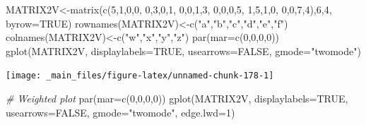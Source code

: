 \documentclass[
  notitlepage,
  onecolumn,
  openany]{book}
\newenvironment{Shaded}{\begin{snugshade}}{\end{snugshade}}
\newcommand{\AttributeTok}[1]{\textcolor[rgb]{0.77,0.63,0.00}{#1}}
\newcommand{\CommentTok}[1]{\textcolor[rgb]{0.56,0.35,0.01}{\textit{#1}}}
\newcommand{\ConstantTok}[1]{\textcolor[rgb]{0.00,0.00,0.00}{#1}}
\newcommand{\DecValTok}[1]{\textcolor[rgb]{0.00,0.00,0.81}{#1}}
\newcommand{\FunctionTok}[1]{\textcolor[rgb]{0.00,0.00,0.00}{#1}}
\newcommand{\NormalTok}[1]{#1}
\newcommand{\OtherTok}[1]{\textcolor[rgb]{0.56,0.35,0.01}{#1}}
\newcommand{\StringTok}[1]{\textcolor[rgb]{0.31,0.60,0.02}{#1}}
\begin{document}
\begin{Shaded}
\begin{Highlighting}[]
\NormalTok{MATRIX2V}\OtherTok{\textless{}{-}}\FunctionTok{matrix}\NormalTok{(}\FunctionTok{c}\NormalTok{(}\DecValTok{5}\NormalTok{,}\DecValTok{1}\NormalTok{,}\DecValTok{0}\NormalTok{,}\DecValTok{0}\NormalTok{,}
                   \DecValTok{0}\NormalTok{,}\DecValTok{3}\NormalTok{,}\DecValTok{0}\NormalTok{,}\DecValTok{1}\NormalTok{,}
                   \DecValTok{0}\NormalTok{,}\DecValTok{0}\NormalTok{,}\DecValTok{1}\NormalTok{,}\DecValTok{3}\NormalTok{,}
                   \DecValTok{0}\NormalTok{,}\DecValTok{0}\NormalTok{,}\DecValTok{0}\NormalTok{,}\DecValTok{5}\NormalTok{,}
                   \DecValTok{1}\NormalTok{,}\DecValTok{5}\NormalTok{,}\DecValTok{1}\NormalTok{,}\DecValTok{0}\NormalTok{,}
                   \DecValTok{0}\NormalTok{,}\DecValTok{0}\NormalTok{,}\DecValTok{7}\NormalTok{,}\DecValTok{4}\NormalTok{),}\DecValTok{6}\NormalTok{,}\DecValTok{4}\NormalTok{, }\AttributeTok{byrow=}\ConstantTok{TRUE}\NormalTok{)}
\FunctionTok{rownames}\NormalTok{(MATRIX2V)}\OtherTok{\textless{}{-}}\FunctionTok{c}\NormalTok{(}\StringTok{"a"}\NormalTok{,}\StringTok{"b"}\NormalTok{,}\StringTok{"c"}\NormalTok{,}\StringTok{"d"}\NormalTok{,}\StringTok{"e"}\NormalTok{,}\StringTok{"f"}\NormalTok{)}
\FunctionTok{colnames}\NormalTok{(MATRIX2V)}\OtherTok{\textless{}{-}}\FunctionTok{c}\NormalTok{(}\StringTok{"w"}\NormalTok{,}\StringTok{"x"}\NormalTok{,}\StringTok{"y"}\NormalTok{,}\StringTok{"z"}\NormalTok{)}
\FunctionTok{par}\NormalTok{(}\AttributeTok{mar=}\FunctionTok{c}\NormalTok{(}\DecValTok{0}\NormalTok{,}\DecValTok{0}\NormalTok{,}\DecValTok{0}\NormalTok{,}\DecValTok{0}\NormalTok{))}
\FunctionTok{gplot}\NormalTok{(MATRIX2V, }\AttributeTok{displaylabels=}\ConstantTok{TRUE}\NormalTok{, }
      \AttributeTok{usearrows=}\ConstantTok{FALSE}\NormalTok{, }\AttributeTok{gmode=}\StringTok{"twomode"}\NormalTok{)}
\end{Highlighting}
\end{Shaded}

\texttt{[image: \_main\_files/figure-latex/unnamed-chunk-178-1]}

\begin{Shaded}
\begin{Highlighting}[]
\CommentTok{\# Weighted plot}
\FunctionTok{par}\NormalTok{(}\AttributeTok{mar=}\FunctionTok{c}\NormalTok{(}\DecValTok{0}\NormalTok{,}\DecValTok{0}\NormalTok{,}\DecValTok{0}\NormalTok{,}\DecValTok{0}\NormalTok{))}
\FunctionTok{gplot}\NormalTok{(MATRIX2V, }\AttributeTok{displaylabels=}\ConstantTok{TRUE}\NormalTok{, }
      \AttributeTok{usearrows=}\ConstantTok{FALSE}\NormalTok{, }
      \AttributeTok{gmode=}\StringTok{"twomode"}\NormalTok{,}
      \AttributeTok{edge.lwd=}\DecValTok{1}\NormalTok{)}
\end{Highlighting}
\end{Shaded}
\end{document}
